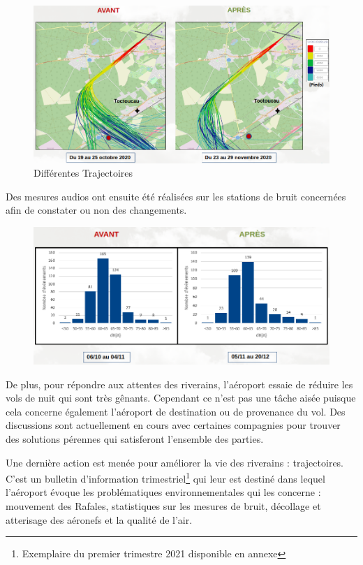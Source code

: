 \begin{figure}[hbt!]
  \centering
  \includegraphics[width=13.5cm]{Images/trajectoires_avant_apres.png}\newline
  \caption{Différentes Trajectoires}
  \label{fig:trajectoires}
\end{figure}

Des mesures audios ont ensuite été réalisées sur les stations de bruit concernées afin de constater ou non des changements.

\begin{figure}[hbt!]
  \centering
  \includegraphics[width=14cm]{Images/bruit_avant_apres.png}\newline
  \label{fig:Mesures audios}
\end{figure}

De plus, pour répondre aux attentes des riverains, l'aéroport essaie de réduire les vols de nuit qui sont très gênants. Cependant ce n'est pas une tâche aisée puisque cela concerne également l'aéroport de destination ou de provenance du vol. Des discussions sont actuellement en cours avec certaines compagnies pour trouver des solutions pérennes qui satisferont l'ensemble des parties.\newline


Une dernière action est menée pour améliorer la vie des riverains : trajectoires. C'est un bulletin d'information trimestriel\footnote{Exemplaire du premier trimestre 2021 disponible en annexe} qui leur est destiné dans lequel l'aéroport évoque les problématiques environnementales qui les concerne : mouvement des Rafales, statistiques sur les mesures de bruit, décollage et atterisage des aéronefs et la qualité de l'air.


